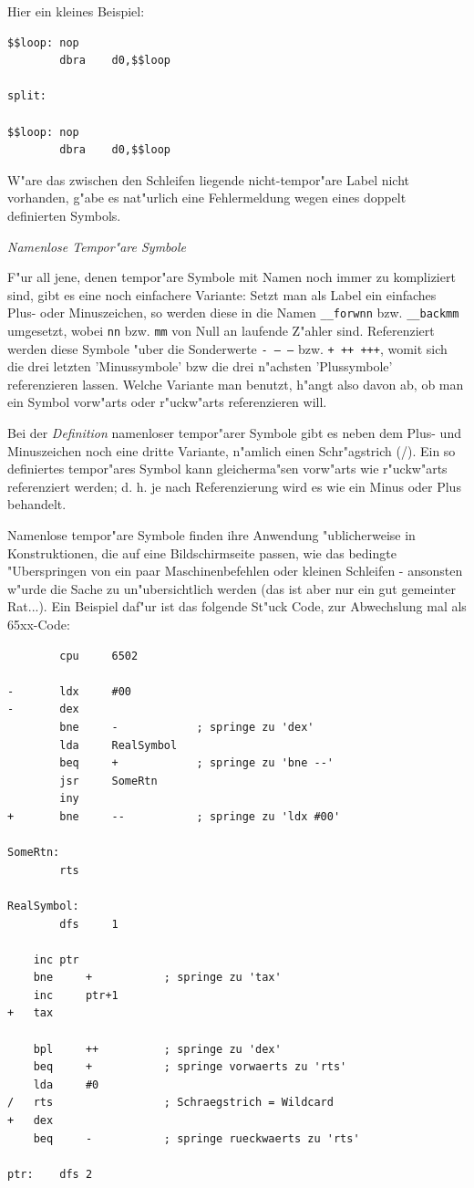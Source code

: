 \documentclass[12pt,a4paper,twoside]{report}
\begin{document}
Hier ein kleines Beispiel:
\begin{verbatim}
$$loop: nop
        dbra    d0,$$loop

split:

$$loop: nop
        dbra    d0,$$loop
\end{verbatim}
W"are das zwischen den Schleifen liegende nicht-tempor"are Label nicht
vorhanden, g"abe es nat"urlich eine Fehlermeldung wegen eines doppelt
definierten Symbols.

{\em Namenlose Tempor"are Symbole}

F"ur all jene, denen tempor"are Symbole mit Namen noch immer zu
kompliziert sind, gibt es eine noch einfachere Variante: Setzt man als
Label ein einfaches Plus- oder Minuszeichen, so werden diese in die Namen
{\tt \_\_forwnn} bzw. {\tt \_\_backmm} umgesetzt, wobei {\tt nn} bzw. {\tt mm}
von Null an laufende Z"ahler sind.  Referenziert werden diese Symbole
"uber die Sonderwerte {\tt - -- ---} bzw. {\tt + ++ +++}, womit sich die
drei letzten 'Minussymbole' bzw die drei n"achsten 'Plussymbole'
referenzieren lassen.  Welche Variante man benutzt, h"angt also davon ab,
ob man ein Symbol vorw"arts oder r"uckw"arts referenzieren will.

Bei der {\em Definition} namenloser tempor"arer Symbole gibt es neben dem
Plus- und Minuszeichen noch eine dritte Variante, n"amlich einen
Schr"agstrich (/).  Ein so definiertes tempor"ares Symbol kann
gleicherma"sen vorw"arts wie r"uckw"arts referenziert werden; d. h. je
nach Referenzierung wird es wie ein Minus oder Plus behandelt.

Namenlose tempor"are Symbole finden ihre Anwendung "ublicherweise in
Konstruktionen, die auf eine Bildschirmseite passen, wie das bedingte
"Uberspringen von ein paar Maschinenbefehlen oder kleinen Schleifen -
ansonsten w"urde die Sache zu un"ubersichtlich werden (das ist aber nur
ein gut gemeinter Rat...).  Ein Beispiel daf"ur ist das folgende St"uck
Code, zur Abwechslung mal als 65xx-Code:
\begin{verbatim}
        cpu     6502

-       ldx     #00
-       dex
        bne     -            ; springe zu 'dex'
        lda     RealSymbol
        beq     +            ; springe zu 'bne --'
        jsr     SomeRtn
        iny
+       bne     --           ; springe zu 'ldx #00'

SomeRtn:
        rts

RealSymbol:
        dfs     1

  	inc	ptr
   	bne 	+      	    ; springe zu 'tax'
   	inc 	ptr+1
+ 	tax

 	bpl 	++     	    ; springe zu 'dex'
   	beq 	+      	    ; springe vorwaerts zu 'rts'
   	lda 	#0
/  	rts            	    ; Schraegstrich = Wildcard
+ 	dex
   	beq 	-           ; springe rueckwaerts zu 'rts'

ptr:	dfs	2
\end{verbatim}
\end{document}
